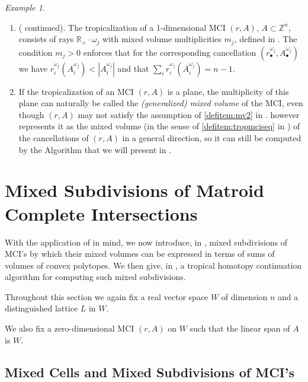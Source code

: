 \documentclass[a4paper]{article}
\theoremstyle{remark}
\newtheorem{example}{Example}
\def\RR{\mathbb{R}}
\def\ZZ{\mathbb{Z}}
\begin{document}
\begin{example}
  \label{ex:matroidcurve1}
  \begin{enumerate}
  \item ( continued). The tropicalization of a
    1-dimensional MCI $(r,A),\,A\subset\ZZ^n$, consists of rays
    $\RR_+\cdot\omega_j$ with mixed volume multiplicities $m_j$, defined in
    . The condition $m_j > 0$ enforces that for
    the corresponding cancellation
    $(r_{\bullet}^{\omega_j},A_{\bullet}^{\omega_j})$ we have
    $r_i^{\omega_j}(A_i^{\omega_j}) < | A_i^{\omega_j}|$ and that
    $\sum_ir_i^{\omega_j}(A_i^{\omega_j}) = n - 1$.
  \item If the tropicalization of an MCI $(r,A)$ is a plane, the
    multiplicity of this plane can naturally be called the {\em
      (generalized) mixed volume} of the MCI, even though $(r,A)$ may
    not satisfy the assumption of \cref{defitem:mv2} in
    .  however represents it as the
    mixed volume (in the sense of \cref{defitem:tropmciseq} in
    ) of the cancellations of $(r,A)$ in a general
    direction, so it can still be computed by the Algorithm that we
    will present in .
  \end{enumerate}
\end{example}

\section{Mixed Subdivisions of Matroid Complete Intersections}
\label{sec:msd}

With the application of  in mind, we now introduce,
in , mixed subdivisions of MCI's by which their mixed
volumes can be expressed in terms of sums of volumes of convex
polytopes. We then give, in , a tropical homotopy
continuation algorithm for computing such mixed subdivisions.

Throughout this section we again fix a real vector space $W$ of
dimension $n$ and a distinguished lattice $L$ in $W$.

We also fix a zero-dimensional MCI $(r,A)$ on $W$ such that the linear
span of $A$ is $W$.

\subsection{Mixed Cells and Mixed Subdivisions of MCI's}
\label{sec:mcims}
\end{document}

